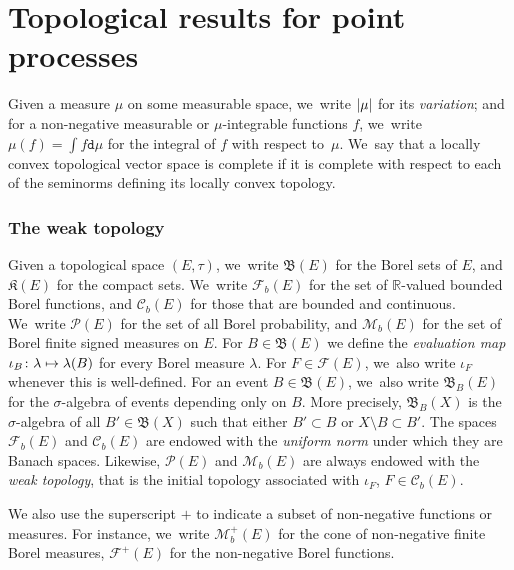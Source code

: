 \documentclass[JEP,XML,SOM,Unicode,published]{cedram}
\newcommand\mto{\mathchoice{\longmapsto}{\mapsto}{\mapsto}{\mapsto}}
\newcommand{\real}{\mathbb{R}}
\theoremstyle{definition}
\theoremstyle{remark}
\DeclarePairedDelimiter{\abs}{\lvert}{\rvert}
\begin{document}
\section{Topological results for point processes}\label{s:reminders}

Given a measure $\mu$ on some measurable space, we~write $\abs{\mu}$ for its \emph{variation}; and for a non-negative measurable or $\mu$-integrable functions $f$, we~write $\mu(f) = \int f \mathtt{d} \mu$ for the integral of $f$ with respect to~$\mu$. We~say that a locally convex topological vector space is complete if it is complete with respect to each of the seminorms defining its locally convex topology.\vspace*{-5pt}

\subsubsection{The weak topology}
Given a topological space $(E,\tau)$, we~write $\mathfrak{B}(E)$ for the Borel sets of $E$, and $\mathfrak{K}(E)$ for the compact sets. We~write $\mathscr{F}_{b}(E)$ for the set of $\real$-valued bounded Borel functions, and $\mathscr{C}_{b}(E)$ for those that are bounded and continuous. We~write $\mathscr{P}(E)$ for the set of all Borel probability, and $\mathscr{M}_{b}(E)$ for the set of Borel finite signed measures on $E$.
For $B \in \mathfrak{B}(E)$ we define the \emph{evaluation map} $\iota_{B}\colon \lambda \mto \lambda(B)$ for every Borel measure $\lambda$.
For $F \in \mathscr{F}(E)$, we~also write $\iota_{F}$ whenever this is well-defined.
For an event $B \in \mathfrak{B}(E)$, we~also write $\mathfrak{B}_{B}(E)$ for the $\sigma$-algebra of events depending only on $B$.
More precisely, $\mathfrak{B}_{B}(X)$ is the $\sigma$-algebra of all $B' \in \mathfrak{B}(X)$ such that either $B' \subset B$ or $X \setminus B \subset B'$.
The spaces $\mathscr{F}_{b}(E)$ and $\mathscr{C}_{b}(E)$ are endowed with the \emph{uniform norm} under which they are Banach spaces.
Likewise, $\mathscr{P}(E)$ and $\mathscr{M}_{b}(E)$ are always endowed with the \emph{weak topology}, that is the initial topology associated with $\iota_{F}$, $F \in \mathscr{C}_{b}(E)$.

We also use the superscript $+$ to indicate a subset of non-negative functions or measures.
For instance, we~write $\mathscr{M}_{b}^{+}(E)$ for the cone of non-negative finite Borel measures, $\mathscr{F}^{+}(E)$ for the non-negative Borel functions.\vspace*{-5pt}\enlargethispage{.7\baselineskip}%
\end{document}
